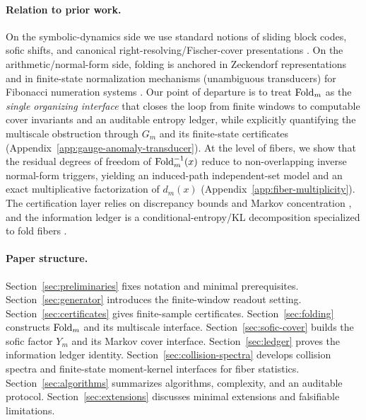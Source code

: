 \paragraph{Relation to prior work.}
On the symbolic-dynamics side we use standard notions of sliding block codes, sofic shifts, and canonical right-resolving/Fischer-cover presentations \cite{LindMarcus1995,Kitchens1998SymbolicDynamics,Weiss1973SFTandSofic,CovenPaul1975SoficSystems}.
On the arithmetic/normal-form side, folding is anchored in Zeckendorf representations \cite{Zeckendorf1972} and in finite-state normalization mechanisms (unambiguous transducers) for Fibonacci numeration systems \cite{ITA_2001__35_6_491_0}.
Our point of departure is to treat $\mathrm{Fold}_m$ as the \emph{single organizing interface} that closes the loop from finite windows to computable cover invariants and an auditable entropy ledger, while explicitly quantifying the multiscale obstruction through $G_m$ and its finite-state certificates (Appendix~\ref{app:gauge-anomaly-transducer}).
At the level of fibers, we show that the residual degrees of freedom of $\mathrm{Fold}_m^{-1}(x)$ reduce to non-overlapping inverse normal-form triggers, yielding an induced-path independent-set model and an exact multiplicative factorization of $d_m(x)$ (Appendix~\ref{app:fiber-multiplicity}).
The certification layer relies on discrepancy bounds \cite{KuipersNiederreiter1974} and Markov concentration \cite{Paulin2015MarkovConcentration}, and the information ledger is a conditional-entropy/KL decomposition specialized to fold fibers \cite{CoverThomas2006,SasonVerdu2016fDivergence}.

\paragraph{Paper structure.}
Section~\ref{sec:preliminaries} fixes notation and minimal prerequisites.
Section~\ref{sec:generator} introduces the finite-window readout setting.
Section~\ref{sec:certificates} gives finite-sample certificates.
Section~\ref{sec:folding} constructs $\mathrm{Fold}_m$ and its multiscale interface.
Section~\ref{sec:sofic-cover} builds the sofic factor $Y_m$ and its Markov cover interface.
Section~\ref{sec:ledger} proves the information ledger identity.
Section~\ref{sec:collision-spectra} develops collision spectra and finite-state moment-kernel interfaces for fiber statistics.
Section~\ref{sec:algorithms} summarizes algorithms, complexity, and an auditable protocol.
Section~\ref{sec:extensions} discusses minimal extensions and falsifiable limitations.

